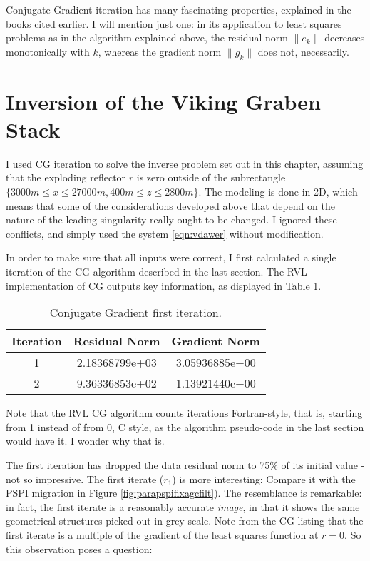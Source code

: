 Conjugate Gradient iteration has many fascinating properties, explained in the books cited earlier. I will mention just one: in its application to least squares problems as in the algorithm explained above, the residual norm $\|e_k\|$ decreases monotonically with $k$, whereas the gradient norm $\|g_k\|$ does not, necessarily. 

\section{Inversion of the Viking Graben Stack}
I used CG iteration to solve the inverse problem set out in this chapter, assuming that the exploding reflector $r$ is zero outside of the subrectangle $\{3000 m \le x \le 27000m, 400 m \le z \le 2800 m\}$. The modeling is done in 2D, which means that some of the considerations developed above that depend on the nature of the leading singularity really ought to be changed. I ignored these conflicts, and simply used the system \ref{eqn:vdawer} without modification.

In order to make sure that all inputs were correct, I first calculated a single iteration of the CG algorithm described in  the last section. The RVL implementation of CG outputs key information, as displayed in Table 
1.
\begin{table}
\label{tab:cg1it}
\begin{center}
\begin{tabular}{|c|c|c|}
\hline
Iteration   &  Residual Norm &  Gradient Norm\\
\hline 
         1  &  2.18368799e+03    & 3.05936885e+00\\
\hline 
         2  &  9.36336853e+02    & 1.13921440e+00\\
\hline
\end{tabular}
\end{center}
\caption{Conjugate Gradient first iteration.}
\end{table} 
Note that the RVL CG algorithm counts iterations Fortran-style, that is, starting from 1 instead of from 0, C style, as the algorithm pseudo-code in the last section would have it. I wonder why that is.

The first iteration has dropped the data residual norm to 75\% of its initial value - not so impressive. The first iterate ($r_1$) is more interesting:
Compare it with the PSPI migration in Figure \ref{fig:parapspifixagcfilt}).
The resemblance is remarkable: in fact, the first iterate is a reasonably accurate {\em image}, in that it shows the same geometrical structures picked out in grey scale. Note from the CG listing that the first iterate is a multiple of the gradient of the least squares function at $r=0$. So this observation poses a question:

